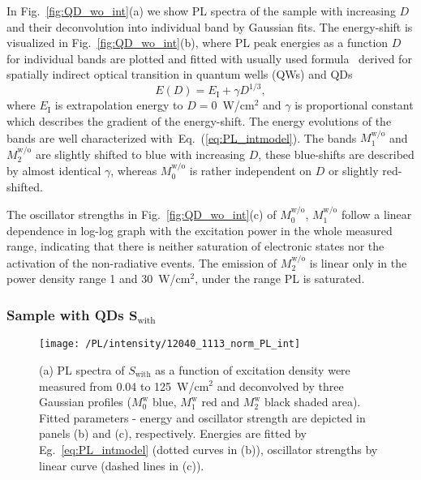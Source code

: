 In Fig.~\ref{fig:QD_wo_int}(a) we show PL spectra of the sample with increasing $D$ and their deconvolution into individual band by Gaussian fits. The energy-shift is visualized in Fig.~\ref{fig:QD_wo_int}(b), where PL peak energies as a function $D$ for individual bands are plotted and fitted with usually used formula~\citep{Hatami_apl1995_intmodel,Glaser_apl1996_intmodel,Ledentsov_prb1995_intmodel} derived for spatially indirect optical transition in quantum wells (QWs) and QDs
%
\begin{equation}
E(D)=E_\mathrm{I}+\gamma D^{1/3}, \label{eq:PL_intmodel}
\end{equation}
%
where $E_\mathrm{I}$ is extrapolation energy to $D=0$~W/cm$^2$ and $\gamma$ is proportional constant which describes the gradient of the energy-shift. The energy evolutions of the bands are well characterized with~Eq.~(\ref{eq:PL_intmodel}). The bands $M_1^\mathrm{w/o}$ and $M_2^\mathrm{w/o}$ are slightly shifted to blue with increasing $D$, these blue-shifts are described by almost identical $\gamma$, whereas $M_0^\mathrm{w/o}$ is rather independent on $D$ or slightly red-shifted.






The oscillator strengths in Fig.~\ref{fig:QD_wo_int}(c) of $M_0^\mathrm{w/o}$, $M_1^\mathrm{w/o}$ follow a linear dependence in log-log graph with the excitation power in the whole measured range, indicating that there is neither saturation of electronic states nor the activation of the non-radiative events. The emission of $M_2^\mathrm{w/o}$ is linear only in the power density range 1 and 30~W/cm$^2$, under the range PL is saturated.

\subsubsection*{Sample with QDs $\mathbf{S_\mathrm{with}}$}
\begin{figure}
	\centering
	\texttt{[image: /PL/intensity/12040\_1113\_norm\_PL\_int]}
	\caption{(a) PL spectra of $S_\mathrm{with}$ as a function of excitation density were measured from 0.04 to 125~W/cm$^2$ and deconvolved by three Gaussian profiles ($M_0^\mathrm{w}$ blue, $M_1^\mathrm{w}$ red and $M_2^\mathrm{w}$ black shaded area). Fitted parameters - energy and oscillator strength are depicted in panels (b) and (c), respectively. Energies are fitted by Eg.~\ref{eq:PL_intmodel} (dotted curves in (b)), oscillator strengths by linear curve (dashed lines in (c)).}
	\label{fig:QD_w_int}
\end{figure}

